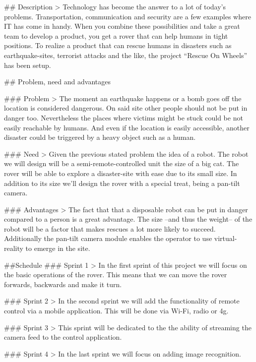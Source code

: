 \documentclass[12pt,twoside]{article}
\begin{document}



\tableofcontents
\newpage
\begin{markdown}

## Description
> Technology has become the answer to a lot of today's problems. Transportation, communication and security are a few examples where IT has come in handy. When you combine these possibilities and take a great team to develop a product, you get a rover that can help humans in tight positions. To realize a product that can rescue humans in disasters such as earthquake-sites, terrorist attacks and the like, the project ``Rescue On Wheels'' has been setup.

## Problem, need and advantages

### Problem
> The moment an earthquake happens or a bomb goes off the location is considered dangerous. On said site other people should not be put in danger too. Nevertheless the places where victims might be stuck could be not easily reachable by humans. And even if the location is easily accessible, another disaster could be triggered by a heavy object such as a human.

### Need
> Given the previous stated problem the idea of a robot. The robot we will design will be a semi-remote-controlled unit the size of a big cat. The rover will be able to explore a disaster-site with ease due to its small size. In addition to its size we'll design the rover with a special treat, being a pan-tilt camera.

### Advantages
> The fact that that a disposable robot can be put in danger compared to a person is a great advantage. The size --and thus the weight-- of the robot will be a factor that makes rescues a lot more likely to succeed. Additionally the pan-tilt camera module enables the operator to use virtual-reality to emerge in the site.
\newpage

##Schedule
### Sprint 1
> In the first sprint of this project we will focus on the basic operations of the rover. This means that we can move the rover forwards, backwards and make it turn.

### Sprint 2
> In the second sprint we will add the functionality of remote control via a mobile application. This will be done via Wi-Fi, radio or 4g.

### Sprint 3
> This sprint will be dedicated to the the ability of streaming the camera feed to the control application.

### Sprint 4
> In the last sprint we will focus on adding image recognition.


\end{markdown}
\end{document}
